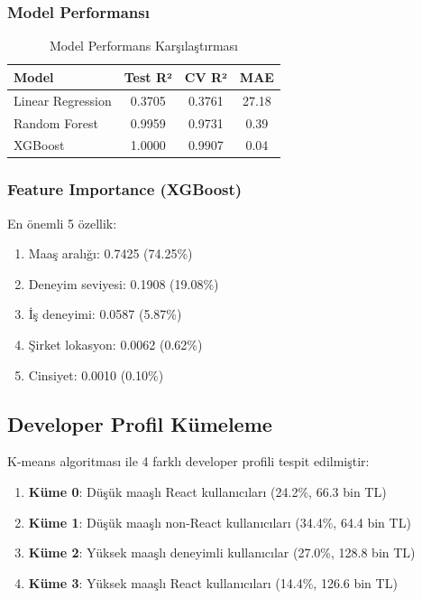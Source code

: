 \documentclass[12pt,a4paper]{article}
\begin{document}
\subsubsection{Model Performansı}
\begin{table}[H]
\centering
\caption{Model Performans Karşılaştırması}
\begin{tabular}{lccc}
\toprule
\textbf{Model} & \textbf{Test R²} & \textbf{CV R²} & \textbf{MAE} \\
\midrule
Linear Regression & 0.3705 & 0.3761 & 27.18 \\
Random Forest & 0.9959 & 0.9731 & 0.39 \\
XGBoost & 1.0000 & 0.9907 & 0.04 \\
\bottomrule
\end{tabular}
\end{table}

\subsubsection{Feature Importance (XGBoost)}
En önemli 5 özellik:
\begin{enumerate}
    \item Maaş aralığı: 0.7425 (74.25\%)
    \item Deneyim seviyesi: 0.1908 (19.08\%)
    \item İş deneyimi: 0.0587 (5.87\%)
    \item Şirket lokasyon: 0.0062 (0.62\%)
    \item Cinsiyet: 0.0010 (0.10\%)
\end{enumerate}

\subsection{Developer Profil Kümeleme}
K-means algoritması ile 4 farklı developer profili tespit edilmiştir:

\begin{enumerate}
    \item \textbf{Küme 0}: Düşük maaşlı React kullanıcıları (24.2\%, 66.3 bin TL)
    \item \textbf{Küme 1}: Düşük maaşlı non-React kullanıcıları (34.4\%, 64.4 bin TL)
    \item \textbf{Küme 2}: Yüksek maaşlı deneyimli kullanıcılar (27.0\%, 128.8 bin TL)
    \item \textbf{Küme 3}: Yüksek maaşlı React kullanıcıları (14.4\%, 126.6 bin TL)
\end{enumerate}
\end{document}
